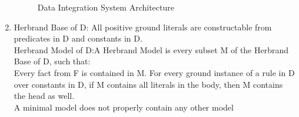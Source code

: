 \documentclass[10pt]{article}
\begin{document}
\begin{enumerate}
\begin{figure}[H]
	     	\caption{Data Integration System Architecture}
	     \end{figure}
	     \bigskip

	    \item
	    Herbrand Base of D: All positive ground literals are constructable from predicates in D and constants in D.
	    \\Herbrand Model of D:A Herbrand Model is every subset M of the Herbrand Base of D, such that:
        \\Every fact from F is contained in M. For every ground instance of a rule in D over constants in D, if M contains all literals 	in the body, then M contains the head as well.
        \\A minimal model does not properly contain any other model
	\end{enumerate}
	
\end{document}
